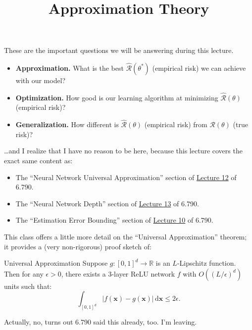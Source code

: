 \title{Approximation Theory}



These are the important questions we will be answering
during this lecture.
\begin{itemize}
    \item \textbf{Approximation.}
    What is the best $\hat{\mathcal{R}}(\theta^*)$
    (empirical risk) we can achieve with our model?
    \item \textbf{Optimization.}
    How good is our learning algorithm
    at minimizing $\hat{\mathcal{R}}(\theta)$ (empirical risk)?
    \item \textbf{Generalization.}
    How different is $\hat{\mathcal{R}}(\theta)$ (empirical risk)
    from $\mathcal{R}(\theta)$ (true risk)?
\end{itemize}

\dots and I realize that I have no reason to be here,
because this lecture covers the exact same content as:
\begin{itemize}
    \item The ``Neural Network Universal Approximation'' section
    of \href{/6.790/lectures/12/#neural-network-universal-approximation}{Lecture 12}
    of 6.790.
    \item The ``Neural Network Depth'' section
    of \href{/6.790/lectures/13/#neural-network-depth}{Lecture 13} of 6.790.
    \item The ``Estimation Error Bounding'' section
    of \href{/6.790/lectures/10/#estimation-error-bounding}{Lecture 10}
    of 6.790.
\end{itemize}

This class offers a little more detail on the
``Universal Approximation'' theorem;
it provides a (very non-rigorous) proof sketch of:

\begin{theorem}{Universal Approximation}
    Suppose $g \colon [0, 1]^d \to \mathbb{R}$ is an $L$-Lipschitz function.
    Then for any $\epsilon > 0$,
    there exists a 3-layer ReLU network $f$
    with $O((L/\epsilon)^d)$ units such that:
    \[ \int_{[0, 1]^d} |f(\mathbf{x}) - g(\mathbf{x})|
    \, \mathrm{d}\mathbf{x} \leq 2 \epsilon. \]
\end{theorem}

Actually, no, turns out 6.790 said this already, too.
I'm leaving.


